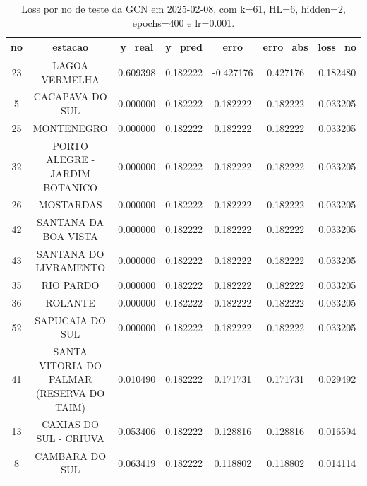 \begin{table}[h]
\centering
\caption{Loss por no de teste da GCN em 2025-02-08, com k=61, HL=6, hidden=2, epochs=400 e lr=0.001.}
\label{tab:gcn_loss_k61_hl6_h2_e400_d20250208}
\begin{tabular}{ccccccc}
\toprule
no & estacao & y\_real & y\_pred & erro & erro\_abs & loss\_no \\
\midrule
23 & LAGOA VERMELHA & 0.609398 & 0.182222 & -0.427176 & 0.427176 & 0.182480 \\
5 & CACAPAVA DO SUL & 0.000000 & 0.182222 & 0.182222 & 0.182222 & 0.033205 \\
25 & MONTENEGRO & 0.000000 & 0.182222 & 0.182222 & 0.182222 & 0.033205 \\
32 & PORTO ALEGRE - JARDIM BOTANICO & 0.000000 & 0.182222 & 0.182222 & 0.182222 & 0.033205 \\
26 & MOSTARDAS & 0.000000 & 0.182222 & 0.182222 & 0.182222 & 0.033205 \\
42 & SANTANA DA BOA VISTA & 0.000000 & 0.182222 & 0.182222 & 0.182222 & 0.033205 \\
43 & SANTANA DO LIVRAMENTO & 0.000000 & 0.182222 & 0.182222 & 0.182222 & 0.033205 \\
35 & RIO PARDO & 0.000000 & 0.182222 & 0.182222 & 0.182222 & 0.033205 \\
36 & ROLANTE & 0.000000 & 0.182222 & 0.182222 & 0.182222 & 0.033205 \\
52 & SAPUCAIA DO SUL & 0.000000 & 0.182222 & 0.182222 & 0.182222 & 0.033205 \\
41 & SANTA VITORIA DO PALMAR (RESERVA DO TAIM) & 0.010490 & 0.182222 & 0.171731 & 0.171731 & 0.029492 \\
13 & CAXIAS DO SUL - CRIUVA & 0.053406 & 0.182222 & 0.128816 & 0.128816 & 0.016594 \\
8 & CAMBARA DO SUL & 0.063419 & 0.182222 & 0.118802 & 0.118802 & 0.014114 \\
\bottomrule
\end{tabular}
\end{table}
